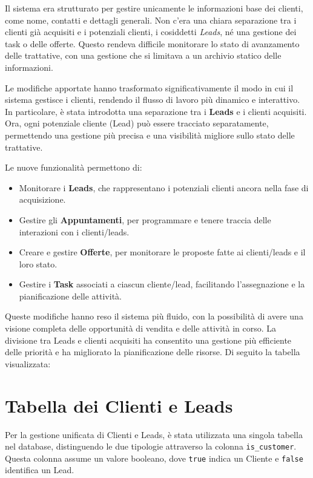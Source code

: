 Il sistema era strutturato per gestire unicamente le informazioni base dei clienti, come nome, contatti e dettagli generali. Non c'era una chiara separazione tra i clienti già acquisiti e i potenziali clienti, i cosiddetti \textit{Leads}, né una gestione dei task o delle offerte. Questo rendeva difficile monitorare lo stato di avanzamento delle trattative, con una gestione che si limitava a un archivio statico delle informazioni.

Le modifiche apportate hanno trasformato significativamente il modo in cui il sistema gestisce i clienti, rendendo il flusso di lavoro più dinamico e interattivo. In particolare, è stata introdotta una separazione tra i \textbf{Leads} e i clienti acquisiti. Ora, ogni potenziale cliente (Lead) può essere tracciato separatamente, permettendo una gestione più precisa e una visibilità migliore sullo stato delle trattative.

Le nuove funzionalità permettono di:
\begin{itemize}
    \item Monitorare i \textbf{Leads}, che rappresentano i potenziali clienti ancora nella fase di acquisizione.
    \item Gestire gli \textbf{Appuntamenti}, per programmare e tenere traccia delle interazioni con i clienti/leads.
    \item Creare e gestire \textbf{Offerte}, per monitorare le proposte fatte ai clienti/leads e il loro stato.
    \item Gestire i \textbf{Task} associati a ciascun cliente/lead, facilitando l'assegnazione e la pianificazione delle attività.
\end{itemize}
Queste modifiche hanno reso il sistema più fluido, con la possibilità di avere una visione completa delle opportunità di vendita e delle attività in corso. La divisione tra Leads e clienti acquisiti ha consentito una gestione più efficiente delle priorità e ha migliorato la pianificazione delle risorse. Di seguito la tabella visualizzata:

\section{Tabella dei Clienti e Leads}\label{sec:cap_sec_subsec_clienti_e_leads}
Per la gestione unificata di Clienti e Leads, è stata utilizzata una singola tabella nel database, distinguendo le due tipologie attraverso la colonna \texttt{is\_customer}. Questa colonna assume un valore booleano, dove \texttt{true} indica un Cliente e \texttt{false} identifica un Lead.

